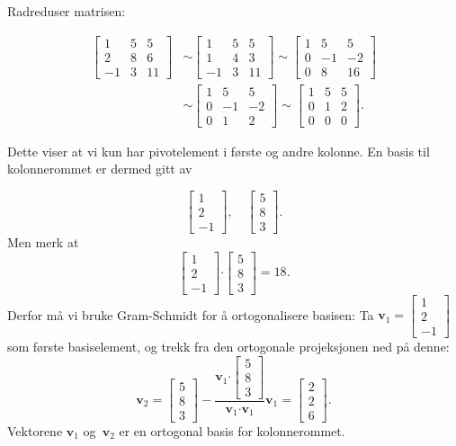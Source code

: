 \documentclass[notitlepage,a4paper,12pt,norsk]{IMFeksamen}
\newcommand{\V}[1]{\mathbf{#1}}
\newcommand{\vvv}[3]{\begin{bmatrix} #1 \\ #2 \\ #3 \end{bmatrix}}
\newcommand{\0}{\V{0}}
\newcommand{\oppgslutt}{
\begin{center}
\pgfornament[width=6cm]{88}
\end{center}
}
\newenvironment{losning}{\begin{oppgave}}{\oppgslutt\end{oppgave}}
\begin{document}
\begin{losning}
Radreduser matrisen:

\begin{align*}
\begin{bmatrix}
1 & 5 & 5 \\
2 & 8 & 6 \\
-1 & 3 & 11
\end{bmatrix} &\sim
\begin{bmatrix}
1 & 5 & 5 \\
1 & 4 & 3 \\
-1 & 3 & 11
\end{bmatrix} \sim
\begin{bmatrix}
1 & 5 & 5 \\
0 & -1 & -2 \\
0 & 8 & 16
\end{bmatrix}\\ &\sim
\begin{bmatrix}
1 & 5 & 5 \\
0 & -1 & -2 \\
0 & 1 & 2
\end{bmatrix} \sim
\begin{bmatrix}
1 & 5 & 5 \\
0 & 1 & 2 \\
0 & 0 & 0
\end{bmatrix}.
\end{align*}

Dette viser at vi kun har pivotelement i første og andre kolonne. En basis til kolonnerommet er dermed gitt av 

$$\vvv{1}{2}{-1}, \quad \vvv{5}{8}{3}.$$
Men merk at 
$$\vvv{1}{2}{-1} \boldsymbol{\cdot} \vvv{5}{8}{3} =18. $$
Derfor må vi bruke Gram-Schmidt for å ortogonalisere basisen:
Ta $\V{v}_1=\vvv{1}{2}{-1}$ som første basiselement, og trekk fra den ortogonale projeksjonen ned på denne:
$$\V{v}_2=\vvv{5}{8}{3}-\frac{\V{v}_1 \boldsymbol{\cdot} \vvv{5}{8}{3}}{\V{v}_1 \boldsymbol{\cdot} \V{v}_1} \V{v}_1=\vvv{2}{2}{6}.$$
Vektorene $\V{v}_1$ og~$\V{v}_2$ er en ortogonal basis for kolonnerommet.

\end{losning}
\end{document}
